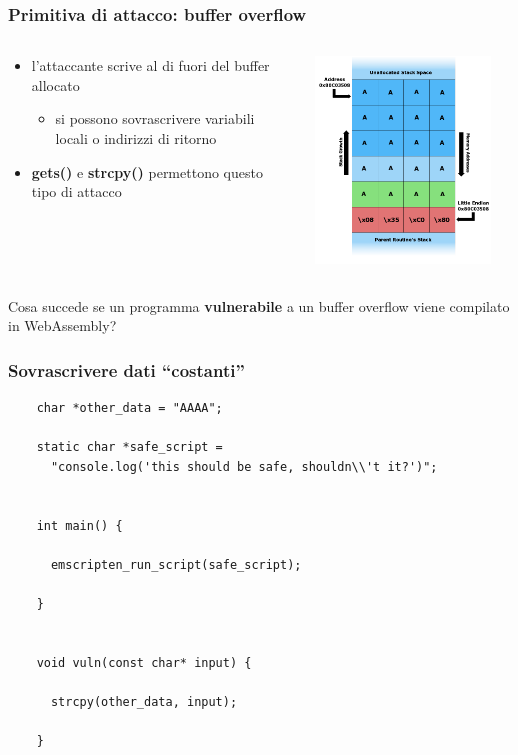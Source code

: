 \documentclass{beamer}
\newcommand\Fontvi{\fontsize{9.5}{7.2}\selectfont}
\begin{document}
\begin{frame}
  \frametitle{Primitiva di attacco: buffer overflow}
  \begin{columns}
    \begin{column}{0.6\textwidth}
      \begin{itemize}
        \item l'attaccante scrive al di fuori del buffer allocato         
        \begin{itemize}
          \item si possono sovrascrivere variabili locali o indirizzi di
            ritorno
        \end{itemize}
        \pause
        \item \textbf{gets()} e \textbf{strcpy()} permettono questo tipo di attacco
        \pause
      \end{itemize} 
        
    \end{column}
    \begin{column}{0.4\textwidth}
      \centerline{\includegraphics[width=9cm,height=5.5cm,keepaspectratio]{images/stack.png}}
    \end{column}
  \end{columns}
  \vspace{0.15in}
  Cosa succede se un programma \textbf{vulnerabile} a un buffer overflow viene compilato
  in WebAssembly?
\end{frame}

\begin{frame}[fragile]
  \frametitle{Sovrascrivere dati ``costanti''}
  \Fontvi
  \begin{verbatim}
    char *other_data = "AAAA";

    static char *safe_script = 
      "console.log('this should be safe, shouldn\\'t it?')";


    int main() {
       
      emscripten_run_script(safe_script);
    
    }


    void vuln(const char* input) {
    
      strcpy(other_data, input);

    }
  \end{verbatim}
\end{frame}
\end{document}
